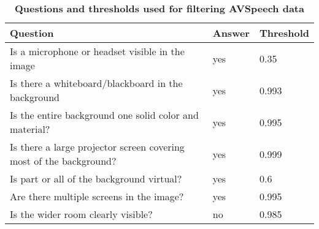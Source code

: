\documentclass{article}
\begin{document}
\begin{center}
\begin{table}
\centering
\caption{\textbf{Questions and thresholds used for filtering AVSpeech data}}
\begin{tabular}{m{6.5cm}|m{2cm}|m{2cm}} 
    \hline
    Question & Answer & Threshold\\
    \hline
    Is a microphone or headset visible in the image & yes & 0.35\\
    \hline
    Is there a whiteboard/blackboard in the background & yes & 0.993\\
    \hline
    Is the entire background one solid color and material? & yes & 0.995\\
    \hline
    Is there a large projector screen covering most of the background? & yes & 0.999\\
    \hline
    Is part or all of the background virtual? & yes & 0.6\\
    \hline
    Are there multiple screens in the image? & yes & 0.995\\
    \hline
    Is the wider room clearly visible? & no & 0.985\\
    \hline
\end{tabular}
\end{table}
\end{center}

\pagebreak


\end{document}
